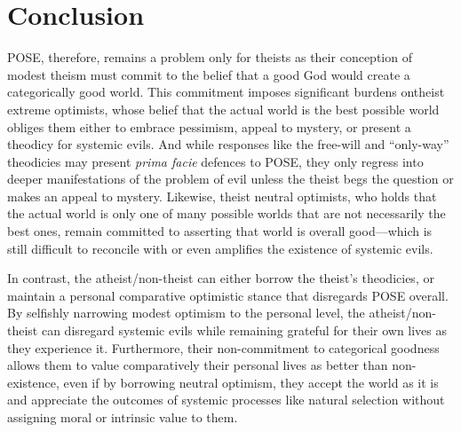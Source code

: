 \section*{Conclusion}

POSE, therefore, remains a problem only for theists as their conception
of modest theism must commit to the belief that a good God would create
a categorically good world. This commitment imposes significant burdens
ontheist extreme optimists, whose belief that the actual world is the
best possible world obliges them either to embrace pessimism, appeal to
mystery, or present a theodicy for systemic evils. And while responses
like the free-will and ``only-way'' theodicies may present \emph{prima
facie} defences to POSE, they only regress into deeper manifestations of
the problem of evil unless the theist begs the question or makes an
appeal to mystery. Likewise, theist neutral optimists, who holds that
the actual world is only one of many possible worlds that are not
necessarily the best ones, remain committed to asserting that world is
overall good---which is still difficult to reconcile with or even
amplifies the existence of systemic evils.

In contrast, the atheist/non-theist can either borrow the
theist's theodicies, or maintain a personal comparative optimistic
stance that disregards POSE overall. By selfishly narrowing modest
optimism to the personal level, the atheist/non-theist can disregard
systemic evils while remaining grateful for their own lives as they
experience it. Furthermore, their non-commitment to categorical goodness
allows them to value comparatively their personal lives as better than
non-existence, even if by borrowing neutral optimism, they accept the
world as it is and appreciate the outcomes of systemic processes like
natural selection without assigning moral or intrinsic value to them.


